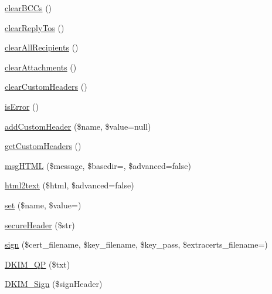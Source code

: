 \begin{DoxyCompactItemize}
\hyperlink{classPHPMailer_1_1PHPMailer_1_1PHPMailer_a3e74b0da9701ae9b78d0caca812db837}{clear\+B\+C\+Cs} ()
\item 
\hyperlink{classPHPMailer_1_1PHPMailer_1_1PHPMailer_a5537cecad0a648d4dd505b77acf33781}{clear\+Reply\+Tos} ()
\item 
\hyperlink{classPHPMailer_1_1PHPMailer_1_1PHPMailer_a9f567e394066bf66ba14a612b8e41af7}{clear\+All\+Recipients} ()
\item 
\hyperlink{classPHPMailer_1_1PHPMailer_1_1PHPMailer_af48c84abf13c5cea2384dee054930b27}{clear\+Attachments} ()
\item 
\hyperlink{classPHPMailer_1_1PHPMailer_1_1PHPMailer_a87b3d535bd3ee926608b5b4b48640959}{clear\+Custom\+Headers} ()
\item 
\hyperlink{classPHPMailer_1_1PHPMailer_1_1PHPMailer_a4f473f38c0b61b399dd1331809c8097f}{is\+Error} ()
\item 
\hyperlink{classPHPMailer_1_1PHPMailer_1_1PHPMailer_a80d083218cb9ffce85f491cbf19a683b}{add\+Custom\+Header} (\$name, \$value=null)
\item 
\hyperlink{classPHPMailer_1_1PHPMailer_1_1PHPMailer_a69224d72c49c98a36da37f6fb15e461a}{get\+Custom\+Headers} ()
\item 
\hyperlink{classPHPMailer_1_1PHPMailer_1_1PHPMailer_a5755ed6db2b8f2d3eff1f2ff1c89dd70}{msg\+H\+T\+ML} (\$message, \$basedir=\textquotesingle{}\textquotesingle{}, \$advanced=false)
\item 
\hyperlink{classPHPMailer_1_1PHPMailer_1_1PHPMailer_ad674ab0cda5f2ad625927768bef6c081}{html2text} (\$html, \$advanced=false)
\item 
\hyperlink{classPHPMailer_1_1PHPMailer_1_1PHPMailer_acf567274449fbed4bd882bccf67ca7ed}{set} (\$name, \$value=\textquotesingle{}\textquotesingle{})
\item 
\hyperlink{classPHPMailer_1_1PHPMailer_1_1PHPMailer_a9d10e00915a06b82690a52bed37de80f}{secure\+Header} (\$str)
\item 
\hyperlink{classPHPMailer_1_1PHPMailer_1_1PHPMailer_a8a3dcf3c7cae06970937c1e8e85241ea}{sign} (\$cert\+\_\+filename, \$key\+\_\+filename, \$key\+\_\+pass, \$extracerts\+\_\+filename=\textquotesingle{}\textquotesingle{})
\item 
\hyperlink{classPHPMailer_1_1PHPMailer_1_1PHPMailer_a196685b4b2a4f98988533f7c55b2df43}{D\+K\+I\+M\+\_\+\+QP} (\$txt)
\item 
\hyperlink{classPHPMailer_1_1PHPMailer_1_1PHPMailer_a2bead1890dd20b30e1089a65dd44a669}{D\+K\+I\+M\+\_\+\+Sign} (\$sign\+Header)
\item 

\end{DoxyCompactItemize}
